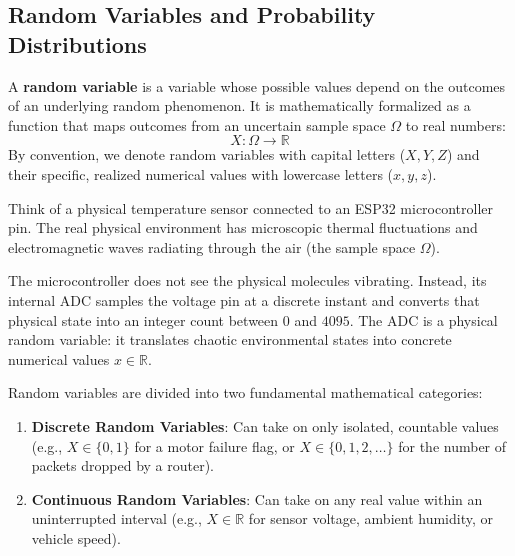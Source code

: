 \subsection{Random Variables and Probability Distributions}\label{subsec:prob_random_variables}

\begin{keyidea}
A \textbf{random variable} is a variable whose possible values depend on the outcomes of an underlying random phenomenon. It is mathematically formalized as a function that maps outcomes from an uncertain sample space $\Omega$ to real numbers:
\begin{equation}
X: \Omega \to \mathbb{R}
\end{equation}
By convention, we denote random variables with capital letters ($X, Y, Z$) and their specific, realized numerical values with lowercase letters ($x, y, z$).
\end{keyidea}

\begin{analogy}
Think of a physical temperature sensor connected to an ESP32 microcontroller pin. The real physical environment has microscopic thermal fluctuations and electromagnetic waves radiating through the air (the sample space $\Omega$). 

The microcontroller does not see the physical molecules vibrating. Instead, its internal ADC samples the voltage pin at a discrete instant and converts that physical state into an integer count between $0$ and $4095$. The ADC is a physical random variable: it translates chaotic environmental states into concrete numerical values $x \in \mathbb{R}$.
\end{analogy}

Random variables are divided into two fundamental mathematical categories:
\begin{enumerate}
    \item \textbf{Discrete Random Variables}: Can take on only isolated, countable values (e.g., $X \in \{0, 1\}$ for a motor failure flag, or $X \in \{0, 1, 2, \dots\}$ for the number of packets dropped by a router).
    \item \textbf{Continuous Random Variables}: Can take on any real value within an uninterrupted interval (e.g., $X \in \mathbb{R}$ for sensor voltage, ambient humidity, or vehicle speed).
\end{enumerate}

